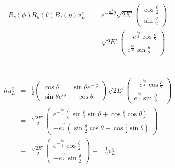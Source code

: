 \documentclass[11pt]{article}
\begin{document}
\begin{eqnarray}
    R_z(\phi)  R_y(\theta)B_z(\eta)u_L^c &=& e^{-\frac{i \sigma^3}{2} \theta}\sqrt{2E'}
    \begin{pmatrix}
        \cos\frac{\theta}{2} \\ \sin\frac{\theta}{2}
    \end{pmatrix}\\
    &=& \sqrt{2E'}
    \begin{pmatrix}
        -e^{\frac{i \phi}{2}}\cos\frac{\theta}{2} \\ e^{\frac{i \phi}{2}}\sin\frac{\theta}{2}
    \end{pmatrix}
\end{eqnarray}

\section{ }
\begin{eqnarray}
    h u_L^c&=&\frac{1}{2} 
    \begin{pmatrix}
        \cos\theta & \sin\theta e^{-i\phi} \\ 
        \sin\theta e^{i\phi} & -\cos\theta
    \end{pmatrix}
    \sqrt{2E'}
    \begin{pmatrix}
        -e^{\frac{i \phi}{2}}\cos\frac{\theta}{2} \\ e^{\frac{i \phi}{2}}\sin\frac{\theta}{2}
    \end{pmatrix} \\
    &=& \frac{\sqrt{2E'}}{2}
    \begin{pmatrix}
        e^{-\frac{i \phi}{2}}(\sin\frac{\theta}{2}\sin\theta+\cos\frac{\theta}{2}\cos\theta)\\ -e^{\frac{i \phi}{2}}(\sin\frac{\theta}{2}\cos\theta- \cos\frac{\theta}{2}\sin\theta)
    \end{pmatrix}\\ 
    &=& \frac{\sqrt{2E'}}{2}
    \begin{pmatrix}
        e^{-\frac{i \phi}{2}}\cos \frac{\theta}{2} \\ -e^{\frac{i \phi}{2}}\sin \frac{\theta}{2}
    \end{pmatrix}
    =-\frac{1}{2}u_L^c
\end{eqnarray}
\end{document}
